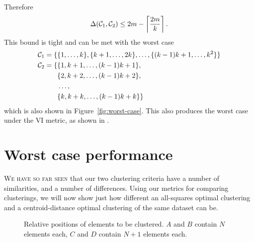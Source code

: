 Therefore
\begin{equation*}
  \Delta(\mathcal{C}_1,\mathcal{C}_2) \leq 2m - \left\lceil \frac{2m}{k} \right\rceil.
\end{equation*}
This bound is tight and can be met with the worst case
\begin{align*}
  \mathcal{C}_1 = \{&\{1,\dotsc,k\},\{k+1,\dotsc,2k\},\dotsc,\{(k-1)k+1,\dotsc,k^2\}\} \\
  \mathcal{C}_2 = \{&\{1,k+1,\dotsc,(k-1)k+1\},\\
  &\{2,k+2,\dotsc,(k-1)k+2\},\\
  &\dotsc,\\
  &\{k,k+k,\dotsc,(k-1)k+k\}\}
\end{align*}
which is also shown in Figure~\ref{fig:worst-case}.  This also produces the
worst case under the VI metric, as shown in \citep{meila-2007}.

\section{Worst case performance}
\label{sec:worst-case-perf}

\textsc{We have so far seen} that our two clustering criteria have a number of
similarities, and a number of differences.  Using our metrics for comparing
clusterings, we will now show just how different an all-squares optimal
clustering and a centroid-distance optimal clustering of the same dataset can
be.

\begin{figure}
  \centering
  \caption{Relative positions of elements to be clustered.  $A$ and $B$
    contain $N$ elements each, $C$ and $D$ contain $N+1$ elements each.}
  \label{fig:clusters}
\end{figure}

